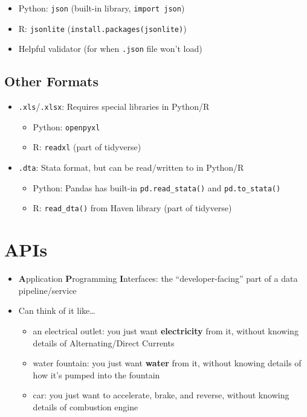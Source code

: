 \documentclass[
  letterpaper,
  DIV=11,
  numbers=noendperiod,
  oneside]{scrreprt}
\providecommand{\tightlist}{%
  \setlength{\itemsep}{0pt}\setlength{\parskip}{0pt}}\usepackage{longtable,booktabs,array}
\begin{document}
\begin{itemize}
\tightlist
\item
  Python: \texttt{json} (built-in library, \texttt{import\ json})
\item
  R: \texttt{jsonlite} (\texttt{install.packages(jsonlite)})
\item
  Helpful validator (for when \texttt{.json} file won't load)
\end{itemize}

\hypertarget{other-formats}{%
\subsection{Other Formats}\label{other-formats}}

\begin{itemize}
\tightlist
\item
  \texttt{.xls}/\texttt{.xlsx}: Requires special libraries in Python/R

  \begin{itemize}
  \tightlist
  \item
    Python: \texttt{openpyxl}
  \item
    R: \texttt{readxl} (part of tidyverse)
  \end{itemize}
\item
  \texttt{.dta}: Stata format, but can be read/written to in Python/R

  \begin{itemize}
  \tightlist
  \item
    Python: Pandas has built-in \texttt{pd.read\_stata()} and
    \texttt{pd.to\_stata()}
  \item
    R: \texttt{read\_dta()} from Haven library (part of tidyverse)
  \end{itemize}
\end{itemize}

\hypertarget{apis}{%
\section{APIs}\label{apis}}

\begin{itemize}
\tightlist
\item
  \textbf{A}pplication \textbf{P}rogramming \textbf{I}nterfaces: the
  ``developer-facing'' part of a data pipeline/service
\item
  Can think of it like\ldots{}

  \begin{itemize}
  \tightlist
  \item
    an electrical outlet: you just want \textbf{electricity} from it,
    without knowing details of Alternating/Direct Currents
  \item
    water fountain: you just want \textbf{water} from it, without
    knowing details of how it's pumped into the fountain
  \item
    car: you just want to accelerate, brake, and reverse, without
    knowing details of combustion engine
  \end{itemize}
\end{itemize}
\end{document}
